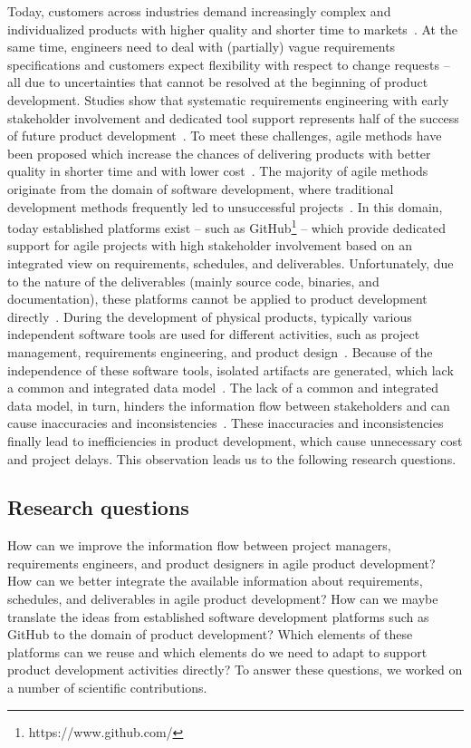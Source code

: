     Today, customers across industries demand increasingly complex and individualized products with higher quality and shorter time to markets~\cite{Ahti2005}.
    At the same time, engineers need to deal with (partially) vague requirements specifications and customers expect flexibility with respect to change requests -- all due to uncertainties that cannot be resolved at the beginning of product development.
    Studies show that systematic requirements engineering with early stakeholder involvement and dedicated tool support represents half of the success of future product development~\cite{6226784}.
    To meet these challenges, agile methods have been proposed which increase the chances of delivering products with better quality in shorter time and with lower cost~\cite{ozkan2019agile}. 
    The majority of agile methods originate from the domain of software development, where traditional development methods frequently led to unsuccessful projects~\cite{HEIMICKE2021786}.
    In this domain, today established platforms exist -- such as GitHub\footnote{https://www.github.com/} -- which provide dedicated support for agile projects with high stakeholder involvement based on an integrated view on requirements, schedules, and deliverables.
    Unfortunately, due to the nature of the deliverables (mainly source code, binaries, and documentation), these platforms cannot be applied to product development directly~\cite{HEIMICKE2021786}. 
    During the development of physical products, typically various independent software tools are used for different activities, such as project management, requirements engineering, and product design~\cite{MarionTucker}.
    Because of the independence of these software tools, isolated artifacts are generated, which lack a common and integrated data model~\cite{houshmand2010collaborative}.
    The lack of a common and integrated data model, in turn, hinders the information flow between stakeholders and can cause inaccuracies and inconsistencies~\cite{Jorma2014}.
    These inaccuracies and inconsistencies finally lead to inefficiencies in product development, which cause unnecessary cost and project delays.
    This observation leads us to the following research questions.
    
    \subsection*{Research questions}
    How can we improve the information flow between project managers, requirements engineers, and product designers in agile product development?
    How can we better integrate the available information about requirements, schedules, and deliverables in agile product development?
    How can we maybe translate the ideas from established software development platforms such as GitHub to the domain of product development?
    Which elements of these platforms can we reuse and which elements do we need to adapt to support product development activities directly?
    To answer these questions, we worked on a number of scientific contributions.

